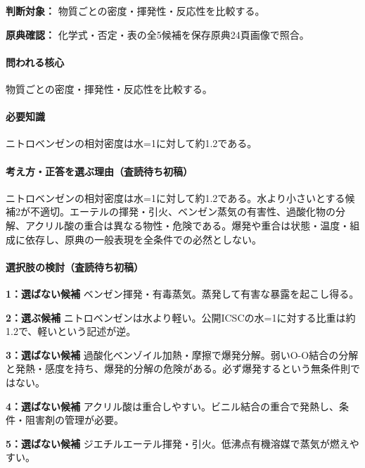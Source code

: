 \noindent\textbf{判断対象：} 物質ごとの密度・揮発性・反応性を比較する。\par

\noindent\textbf{原典確認：} 化学式・否定・表の全5候補を保存原典24頁画像で照合。\par

\paragraph{問われる核心} 物質ごとの密度・揮発性・反応性を比較する。

\paragraph{必要知識} ニトロベンゼンの相対密度は水=1に対して約1.2である。

\paragraph{考え方・正答を選ぶ理由（査読待ち初稿）} ニトロベンゼンの相対密度は水=1に対して約1.2である。水より小さいとする候補2が不適切。エーテルの揮発・引火、ベンゼン蒸気の有害性、過酸化物の分解、アクリル酸の重合は異なる物性・危険である。爆発や重合は状態・温度・組成に依存し、原典の一般表現を全条件での必然としない。

\paragraph{選択肢の検討（査読待ち初稿）}\mbox{}\par

\noindent\textbf{1：選ばない候補} ベンゼン揮発・有毒蒸気。蒸発して有害な暴露を起こし得る。\par

\noindent\textbf{2：選ぶ候補} ニトロベンゼンは水より軽い。公開ICSCの水=1に対する比重は約1.2で、軽いという記述が逆。\par

\noindent\textbf{3：選ばない候補} 過酸化ベンゾイル加熱・摩擦で爆発分解。弱いO-O結合の分解と発熱・感度を持ち、爆発的分解の危険がある。必ず爆発するという無条件則ではない。\par

\noindent\textbf{4：選ばない候補} アクリル酸は重合しやすい。ビニル結合の重合で発熱し、条件・阻害剤の管理が必要。\par

\noindent\textbf{5：選ばない候補} ジエチルエーテル揮発・引火。低沸点有機溶媒で蒸気が燃えやすい。\par

